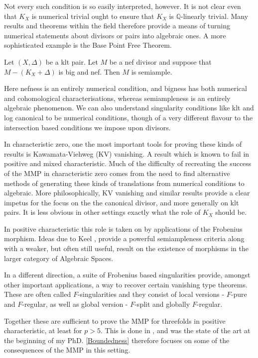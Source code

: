 \documentclass[a4paper,12pt]{book}
\begin{document}
	Not every such condition is so easily interpreted, however. It is not clear even that $K_{X}$ is numerical trivial ought to ensure that $K_{X}$ is $\mathbb{Q}$-linearly trivial. Many results and theorems within the field therefore provide a means of turning numerical statements about divisors or pairs into algebraic ones. A more sophisticated example is the Base Point Free Theorem.
	
	\begin{theorem*}
		Let $(X,\Delta)$ be a klt pair. Let $M$ be a nef divisor and suppose that $M-(K_{X}+\Delta)$ is big and nef. Then $M$ is semiample.
	\end{theorem*}

	Here nefness is an entirely numerical condition, and bigness has both numerical and cohomological characterisations, whereas semiampleness is an entirely algebraic phenomenon. We can also understand singularity conditions like klt and log canonical to be numerical conditions, though of a very different flavour to the intersection based conditions we impose upon divisors.
	
	In characteristic zero, one the most important tools for proving these kinds of results is Kawamata-Viehweg (KV) vanishing. A result which is known to fail in positive and mixed characteristic. Much of the difficulty of recreating the success of the MMP in characteristic zero comes from the need to find alternative methods of generating these kinds of translations from numerical conditions to algebraic. More philosophically, KV vanishing and similar results provide a clear impetus for the focus on the the canonical divisor, and more generally on klt pairs. It is less obvious in other settings exactly what the role of $K_{X}$ should be.
	
	In positive characteristic this role is taken on by applications of the Frobenius morphism. Ideas due to Keel \cite{}, provide a powerful semiampleness criteria along with a weaker, but often still useful, result on the existence of morphisms in the larger category of Algebraic Spaces. 
	
	In a different direction, a suite of Frobenius based singularities provide, amongst other important applications, a way to recover certain vanishing type theorems. These are often called $F$-singularities and they consist of local versions - $F$-pure and $F$-regular, as well as global version - $F$-split and globally $F$-regular.
	
	Together these are sufficient to prove the MMP for threefolds in positive characteristic, at least for $p > 5$. This is done in \cite{}, and was the state of the art at the beginning of my PhD. \autoref{Boundedness} therefore focuses on some of the consequences of the MMP in this setting.
	
\end{document}
